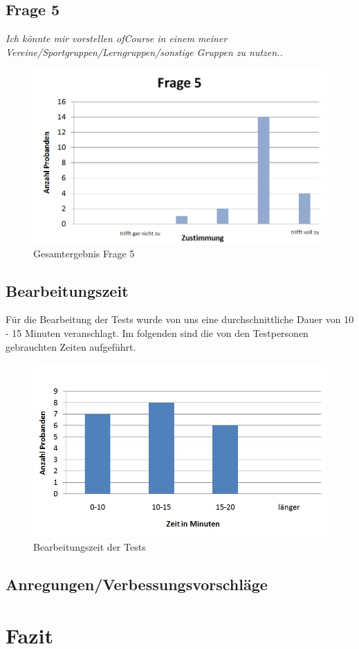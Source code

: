 \subsection{Frage 5}
\begin{center}
	{\it Ich könnte mir vorstellen ofCourse in einem meiner Vereine/Sportgruppen/Lerngruppen/sonstige Gruppen zu nutzen..}
\end{center}
\begin{figure}[h]
\centering
\includegraphics[width=0.7\linewidth]{img/Frage5}
\caption{Gesamtergebnis Frage 5}
\label{fig:Frage5}
\end{figure}


\subsection{Bearbeitungszeit}
Für die Bearbeitung der Tests wurde von uns eine durchschnittliche Dauer von 10 - 15 Minuten veranschlagt. Im folgenden sind die 
von den Testpersonen gebrauchten Zeiten aufgeführt.

\begin{figure}[h]
\centering
\includegraphics[width=0.7\linewidth]{img/Gesamtzeit}
\caption{Bearbeitungszeit der Tests}
\label{fig:Gesamtzeit}
\end{figure}


\subsection{Anregungen/Verbessungsvorschläge}

\section{Fazit}